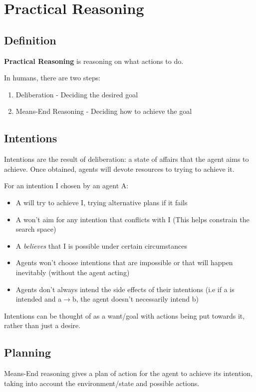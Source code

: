 \section{Practical Reasoning}

\subsection{Definition}
\textbf{Practical Reasoning} is reasoning on what actions to do. 

In humans, there are two steps:
\begin{enumerate}
    \item Deliberation - Deciding the desired goal
    \item Means-End Reasoning - Deciding how to achieve the goal
\end{enumerate}

\subsection{Intentions}
Intentions are the result of deliberation: a state of affairs that the agent aims to achieve. Once obtained, agents will devote resources to trying to achieve it. 

For an intention I chosen by an agent A:
\begin{itemize}
    \item A will try to achieve I, trying alternative plans if it fails
    \item A won't aim for any intention that conflicts with I (This helps constrain the search space)
    \item A \emph{believes} that I is possible under certain circumstances 
    \item Agents won't choose intentions that are impossible or that will happen inevitably (without the agent acting)
    \item Agents don't always intend the side effects of their intentions (i.e if a is intended and a$\rightarrow$b, the agent doesn't necessarily intend b) 
\end{itemize}

Intentions can be thought of as a want/goal with actions being put towards it, rather than just a desire. 

\subsection{Planning}
Means-End reasoning gives a plan of action for the agent to achieve its intention, taking into account the environment/state and possible actions.

